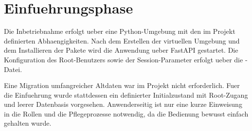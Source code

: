 \section{Einfuehrungsphase}
\label{sec:Einfuehrungsphase}

Die Inbetriebnahme erfolgt ueber eine Python-Umgebung mit den im Projekt
definierten Abhaengigkeiten. Nach dem Erstellen der virtuellen Umgebung und dem
Installieren der Pakete wird die Anwendung ueber FastAPI gestartet. Die
Konfiguration des Root-Benutzers sowie der Session-Parameter erfolgt ueber die
-Datei.

Eine Migration umfangreicher Altdaten war im Projekt nicht erforderlich. Fuer
die Einfuehrung wurde stattdessen ein definierter Initialzustand mit Root-Zugang
und leerer Datenbasis vorgesehen. Anwenderseitig ist nur eine kurze Einweisung
in die Rollen und die Pflegeprozesse notwendig, da die Bedienung bewusst
einfach gehalten wurde.
